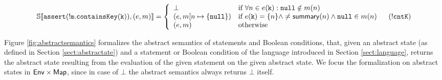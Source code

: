 \begin{figure*}
\[\begin{array}{ll}
\\
\mathbb{S}\llbracket \mathtt{assert(!m.containsKey(k))}, (e, m) \rrbracket = \left\{
\begin{array}{ll}
\bot & \textrm{if } \forall n \in e(\mathtt{k}) : \mathtt{null} \notin m(n)\\
(e, m[n \mapsto \{\mathtt{null}\}) & \textrm{if } e(\mathtt{k}) = \{n\} \land \neq \mathsf{summary}(n) \land \mathtt{null} \in m(n)\\
(e, m) & \textrm{otherwise}\\
\end{array}
\right. & (\mathtt{!cntK})\\
\end{array}
\]
\caption{Formal definition of the abstract semantics}
\label{fig:abstractsemantics}
\end{figure*}
Figure \ref{fig:abstractsemantics} formalizes the abstract semantics of statements and Boolean conditions, that, given an abstract state (as defined in Section \ref{sect:abstractate}) and a statement or Boolean condition of the language introduced in Section \ref{sect:language}, returns the abstract state resulting from the evaluation of the given statement on the given abstract state. We focus the formalization on abstract states in $\mathsf{Env} \times \mathsf{Map}$, since in case of $\bot$ the abstract semantics always returns $\bot$ itself.

